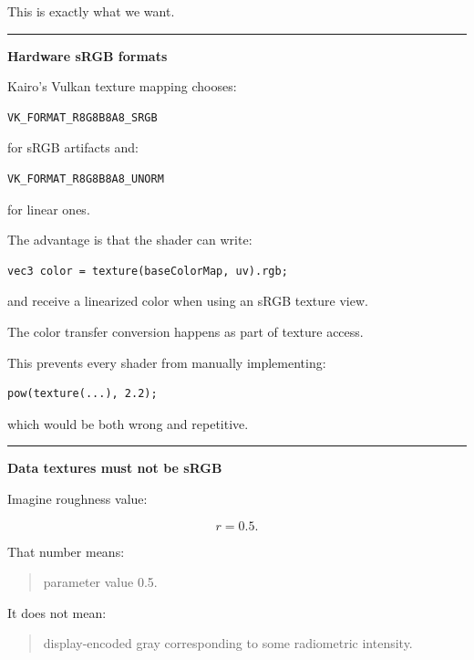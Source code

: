 This is exactly what we want.

\begin{center}\rule{0.5\linewidth}{0.5pt}\end{center}

\textbf{Hardware sRGB formats}

Kairo's Vulkan texture mapping chooses:

\begin{verbatim}
VK_FORMAT_R8G8B8A8_SRGB
\end{verbatim}

for sRGB artifacts and:

\begin{verbatim}
VK_FORMAT_R8G8B8A8_UNORM
\end{verbatim}

for linear ones.

The advantage is that the shader can write:

\begin{verbatim}
vec3 color = texture(baseColorMap, uv).rgb;
\end{verbatim}

and receive a linearized color when using an sRGB texture view.

The color transfer conversion happens as part of texture access.

This prevents every shader from manually implementing:

\begin{verbatim}
pow(texture(...), 2.2);
\end{verbatim}

which would be both wrong and repetitive.

\begin{center}\rule{0.5\linewidth}{0.5pt}\end{center}

\textbf{Data textures must not be sRGB}

Imagine roughness value:

\[
r=0.5.
\]

That number means:

\begin{quote}
parameter value 0.5.
\end{quote}

It does not mean:

\begin{quote}
display-encoded gray corresponding to some radiometric intensity.
\end{quote}

